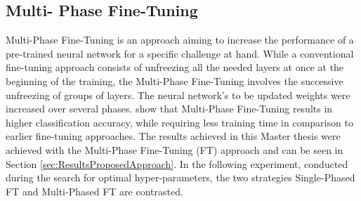 \subsection{Multi- Phase Fine-Tuning}
Multi-Phase Fine-Tuning is an approach aiming to increase the performance of a pre-trained neural network for a specific challenge at hand. While a conventional fine-tuning approach consists of unfreezing all the needed layers at once at the beginning of the training, the Multi-Phase Fine-Tuning involves the successive unfreezing of groups of layers. The neural network's to be updated weights were increased over several phases. \citet{Sarhan:2020:MultiPhaseFineTuning} show that Multi-Phase Fine-Tuning results in higher classification accuracy, while requiring less training time in comparison to earlier fine-tuning approaches.
\newline\newline
The results achieved in this Master thesis were achieved with the Multi-Phase Fine-Tuning (FT) approach and can be seen in Section \ref{sec:ResultsProposedApproach}. In the following experiment, conducted during the search for optimal hyper-parameters, the two strategies Single-Phased FT and Multi-Phased FT are contrasted.

